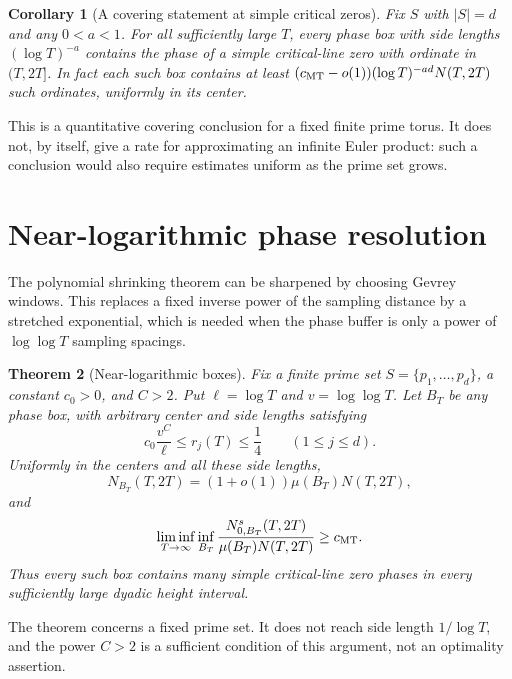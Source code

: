 \documentclass[11pt,letterpaper]{article}
\newtheorem{theorem}{Theorem}[section]
\newtheorem{corollary}[theorem]{Corollary}
\theoremstyle{definition}
\theoremstyle{remark}
\newcommand{\1}{\mathbf 1}
\begin{document}
\begin{corollary}[A covering statement at simple critical zeros]
\label{p04:cor:shrinking-covering}
Fix $S$ with $|S|=d$ and any $0<a<1$. For all sufficiently
large $T$, every phase box with side lengths $(\log T)^{-a}$ contains
the phase of a simple critical-line zero with ordinate in $(T,2T]$.
In fact each such box contains at least
$(c_{\rm MT}-o(1))(\log T)^{-ad}N(T,2T)$ such ordinates,
uniformly in its center.
\end{corollary}

This is a quantitative covering conclusion for a fixed finite prime
torus. It does not, by itself, give a rate for approximating an
infinite Euler product: such a conclusion would also require
estimates uniform as the prime set grows.




\section{Near-logarithmic phase resolution}
\label{p04:sec:near-logarithmic}

The polynomial shrinking theorem can be sharpened by choosing
Gevrey windows.  This replaces a fixed inverse power of the
sampling distance by a stretched exponential, which is needed when
the phase buffer is only a power of $\log\log T$ sampling spacings.

\begin{theorem}[Near-logarithmic boxes]
\label{p04:thm:near-logarithmic}
Fix a finite prime set $S=\{p_1,\ldots,p_d\}$, a constant $c_0>0$,
and $C>2$. Put $\ell=\log T$ and $v=\log\log T$.
Let $B_T$ be any phase box, with arbitrary center and side lengths
satisfying
\begin{equation}\label{p04:eq:nearlog-width}
 c_0\frac{v^C}{\ell}\le r_j(T)\le\frac14
       \qquad(1\le j\le d).
\end{equation}
Uniformly in the centers and all these side lengths,
\[
 N_{B_T}(T,2T)=(1+o(1))\mu(B_T)N(T,2T),
\]
and
\[
 \liminf_{T\to\infty}\inf_{B_T}
 \frac{N^s_{0,B_T}(T,2T)}{\mu(B_T)N(T,2T)}
       \ge c_{\rm MT}.
\]
Thus every such box contains many simple critical-line zero phases
in every sufficiently large dyadic height interval.
\end{theorem}

The theorem concerns a fixed prime set.  It does not reach side
length $1/\log T$, and the power $C>2$ is a sufficient condition of
this argument, not an optimality assertion.
\end{document}
